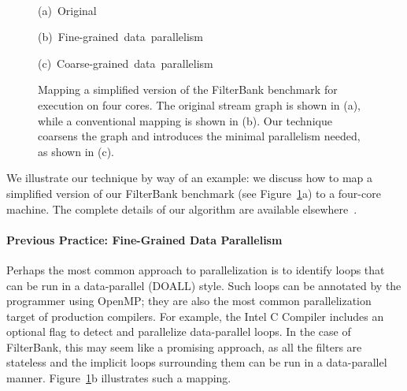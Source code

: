 \begin{figure}[t]

\begin{minipage}{0.3\textwidth}
\centering
{}
\end{minipage}
\hspace{0.1in}
\begin{minipage}{0.3\textwidth}
\centering
{}
\end{minipage}
\hspace{0.4in}
\begin{minipage}{0.3\textwidth}
\centering
{}
\end{minipage}

~ \\
\begin{minipage}{0.3\textwidth}
\centering
\mbox{{\small (a) Original}}
\end{minipage}
\hspace{0.1in}
\begin{minipage}{0.3\textwidth}
\mbox{{\small (b) Fine-grained data parallelism}}
\end{minipage}
\hspace{0.4in}
\begin{minipage}{0.3\textwidth}
\hspace{-14pt}\mbox{{\small (c) Coarse-grained data parallelism}}
\end{minipage}

\centering
\caption[Exploiting data parallelism in the FilterBank
  benchmark]{Mapping a simplified version of the FilterBank benchmark
  for execution on four cores.  The original stream graph is shown in
  (a), while a conventional mapping is shown in (b).  Our technique
  coarsens the graph and introduces the minimal parallelism needed, as
  shown in (c).\protect\label{fig:filterbank}}

\end{figure}

We illustrate our technique by way of an example: we discuss how to
map a simplified version of our FilterBank benchmark (see
Figure~\ref{fig:filterbank}a) to a four-core machine.  The complete
details of our algorithm are available
elsewhere~\cite{gordon-asplos06}.

\paragraph*{Previous Practice: Fine-Grained Data Parallelism}  Perhaps 
the most common approach to parallelization is to identify loops that
can be run in a data-parallel (DOALL) style.  Such loops can be
annotated by the programmer using OpenMP; they are also the most
common parallelization target of production compilers.  For example,
the Intel C Compiler includes an optional flag to detect and
parallelize data-parallel loops.  In the case of FilterBank, this may
seem like a promising approach, as all the filters are stateless and
the implicit loops surrounding them can be run in a data-parallel
manner.  Figure~\ref{fig:filterbank}b illustrates such a mapping.

